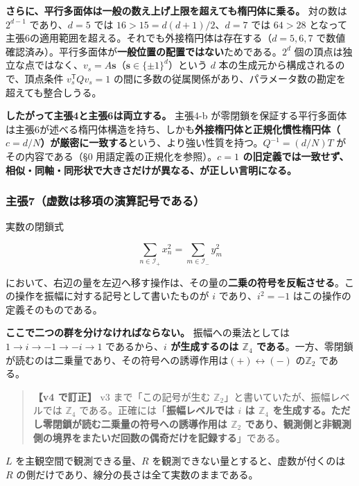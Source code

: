 \documentclass[
  10pt,
]{ltjsarticle}
\begin{document}
\textbf{さらに、平行多面体は一般の数え上げ上限を超えても楕円体に乗る。}
対の数は \(2^{d-1}\) であり、\(d=5\) では
\(16 > 15 = d(d+1)/2\)、\(d=7\) では \(64 > 28\)
となって主張6の適用範囲を超える。それでも外接楕円体は存在する（\(d=5,6,7\)
で数値確認済み）。平行多面体が\textbf{一般位置の配置ではない}ためである。\(2^d\)
個の頂点は独立な点ではなく、\(v_s = A\mathbf{s}\)（\(\mathbf{s}\in\{\pm1\}^d\)）という
\(d\) 本の生成元から構成されるので、頂点条件 \(v_s^{\mathsf T}Qv_s = 1\)
の間に多数の従属関係があり、パラメータ数の勘定を超えても整合しうる。

\textbf{したがって主張4と主張6は両立する。} 主張4-b
が零閉鎖を保証する平行多面体は主張6が述べる楕円体構造を持ち、しかも\textbf{外接楕円体と正規化慣性楕円体（\(c = d/N\)）が厳密に一致する}という、より強い性質を持つ。\(Q^{-1} = (d/N)T\)
がその内容である（§0 用語定義の正規化を参照）。\textbf{\(c=1\)
の旧定義では一致せず、相似・同軸・同形状で大きさだけが異なる、が正しい言明になる。}

\subsubsection{主張7（虚数は移項の演算記号である）}\label{ux4e3bux5f357ux865aux6570ux306fux79fbux9805ux306eux6f14ux7b97ux8a18ux53f7ux3067ux3042ux308b}

実数の閉鎖式

\[\sum_{n \in \mathcal{I}_+} x_n^2 = \sum_{m \in \mathcal{I}_-} y_m^2\]

において、右辺の量を左辺へ移す操作は、その量の\textbf{二乗の符号を反転させる}。この操作を振幅に対する記号として書いたものが
\(i\) であり、\(i^2 = -1\) はこの操作の定義そのものである。

\textbf{ここで二つの群を分けなければならない。} 振幅への乗法としては
\(1 \to i \to -1 \to -i \to 1\) であるから、\textbf{\(i\) が生成するのは
\(\mathbb{Z}_4\)
である}。一方、零閉鎖が読むのは二乗量であり、その符号への誘導作用は\((+)\leftrightarrow(-)\)
の\textbf{\(\mathbb{Z}_2\)} である。

\begin{quote}
\textbf{【v4 で訂正】} v3 まで「この記号が生む
\(\mathbb{Z}_2\)」と書いていたが、振幅レベルでは \(\mathbb{Z}_4\)
である。正確には「\textbf{振幅レベルでは \(i\) は \(\mathbb{Z}_4\)
を生成する。ただし零閉鎖が読む二乗量の符号への誘導作用は
\(\mathbb{Z}_2\)
であり、観測側と非観測側の境界をまたいだ回数の偶奇だけを記録する}」である。
\end{quote}

\(L\) を主観空間で観測できる量、\(R\)
を観測できない量とすると、虚数が付くのは \(R\)
の側だけであり、線分の長さは全て実数のままである。
\end{document}
